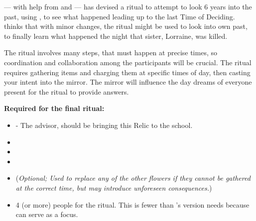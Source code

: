 \documentclass[green]{GL2020}
\begin{document}
\name{\gWhatHappenedToSister{}}

\cHeir{\full} — with help from \cPresident{\full} and \cWildCard{\full} — has devised a ritual to attempt to look 6 years into the past, using \iMirror{}, to see what happened leading up to the last Time of Deciding. \cWildCard{} thinks that with minor changes, the ritual might be used to look into \cWildCard{\their} own past, to finally learn what happened the night that \cWildCard{\their} sister, Lorraine, was killed.

The ritual involves many steps, that must happen at precise times, so coordination and collaboration among the participants will be crucial. The ritual requires gathering items and charging them at specific times of day, then casting your intent into the mirror. The mirror will influence the day dreams of everyone present for the ritual to provide answers.

\textbf{Required for the final ritual:}
\begin{itemize}
  \item \iMirror{} - The \pTech{} advisor, \cDiplomat{\full} should be bringing this Relic to the school.
  \item \iMorningGlory{}
  \item \iLily{}
  \item \iMoonflower{}
  \item \iStoneFlower{} (\emph{Optional; Used to replace any of the other flowers if they cannot be gathered at the correct time, but may introduce unforeseen consequences.})
  \item 4 (or more) people for the ritual. This is fewer than \cHeir{}'s version needs because \cWildCard{} can serve as a focus.
\end{itemize}
\end{document}
